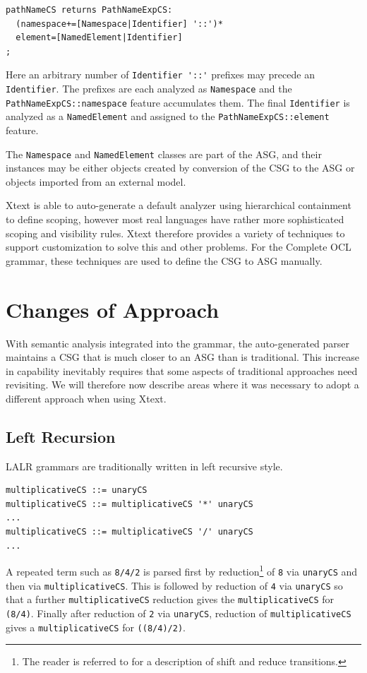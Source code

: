 \documentclass{eceasst}
\begin{document}
{\small\begin{verbatim}
pathNameCS returns PathNameExpCS:
  (namespace+=[Namespace|Identifier] '::')*
  element=[NamedElement|Identifier]
;
\end{verbatim}}

Here an arbitrary number of \verb+Identifier '::'+ prefixes may precede an \verb+Identifier+. The prefixes are each analyzed as \verb+Namespace+ and the \verb+PathNameExpCS::namespace+ feature accumulates them. The final \verb+Identifier+ is analyzed as a \verb+NamedElement+ and assigned to the \verb+PathNameExpCS::element+ feature.

The \verb+Namespace+ and \verb+NamedElement+ classes are part of the ASG, and their instances may be either objects created by conversion of the CSG to the ASG or objects imported from an external model. 

Xtext is able to auto-generate a default analyzer using hierarchical containment to define scoping, however most real languages have rather more sophisticated scoping and visibility rules. Xtext therefore provides a variety of techniques to support customization to solve this and other problems. For the Complete OCL grammar, these techniques are used to define the CSG to ASG manually. 

\section{Changes of Approach}

With semantic analysis integrated into the grammar, the auto-generated parser maintains a CSG that is much closer to an ASG than is traditional. This increase in capability inevitably requires that some aspects of traditional approaches need revisiting. We will therefore now describe areas where it was necessary to adopt a different approach when using Xtext.

\subsection{Left Recursion}

LALR grammars are traditionally written in left recursive style. 

{\small\begin{verbatim}
multiplicativeCS ::= unaryCS
multiplicativeCS ::= multiplicativeCS '*' unaryCS
...
multiplicativeCS ::= multiplicativeCS '/' unaryCS
...
\end{verbatim}}

A repeated term such as \verb+8/4/2+ is parsed first by reduction\footnote{The reader is referred to \cite{dragon} for a description of shift and reduce transitions.} of \verb+8+ via \verb+unaryCS+ and then via \verb+multiplicativeCS+. This is followed by reduction of \verb+4+ via \verb+unaryCS+ so that a further \verb+multiplicativeCS+ reduction gives the  \verb+multiplicativeCS+ for \verb+(8/4)+. Finally after reduction of \verb+2+ via \verb+unaryCS+, reduction of \verb+multiplicativeCS+ gives a \verb+multiplicativeCS+ for \verb+((8/4)/2)+.
\end{document}
